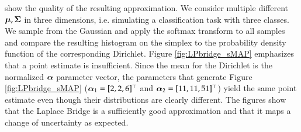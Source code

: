  show the quality of the resulting approximation. We consider multiple different ${\boldsymbol{\mu}}, {\boldsymbol{\Sigma}}$ in three dimensions, i.e. simulating a classification task with three classes. We sample from the Gaussian and apply the softmax transform to all samples and compare the resulting histogram on the simplex to the probability density function of the corresponding Dirichlet. Figure \ref{fig:LPbridge_sMAP} emphasizes that a point estimate is insufficient. Since the mean for the Dirichlet is the normalized ${\boldsymbol{\alpha}}$ parameter vector, the parameters that generate Figure \ref{fig:LPbridge_sMAP} (${\boldsymbol{\alpha}}_1 = [2,2,6]^\top$ and ${\boldsymbol{\alpha}}_2 = [11,11,51]^\top$) yield the same point estimate even though their distributions are clearly different. The figures show that the Laplace Bridge is a sufficiently good approximation and that it maps a change of uncertainty as expected.

